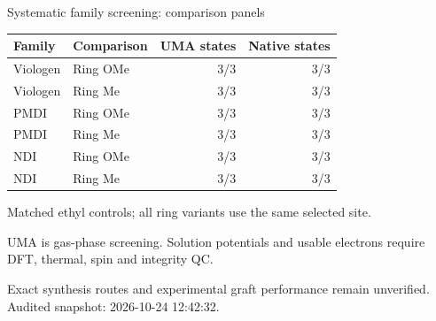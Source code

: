 \begin{frame}{Systematic family screening: comparison panels}
\scriptsize\centering\renewcommand{\arraystretch}{1.1}
\begin{tabular}{@{}llrr@{}}\toprule
Family & Comparison & UMA states & Native states \\ \midrule
Viologen & Ring OMe & 3/3 & 3/3 \\
Viologen & Ring Me & 3/3 & 3/3 \\
PMDI & Ring OMe & 3/3 & 3/3 \\
PMDI & Ring Me & 3/3 & 3/3 \\
NDI & Ring OMe & 3/3 & 3/3 \\
NDI & Ring Me & 3/3 & 3/3 \\
\bottomrule\end{tabular}\par\vspace{1ex}\raggedright
\footnotesize Matched ethyl controls; all ring variants use the same selected site.
\par\vspace{1ex}UMA is gas-phase screening. Solution potentials and usable electrons require DFT, thermal, spin and integrity QC.
\par\vspace{1ex}Exact synthesis routes and experimental graft performance remain unverified.
\vfill\scriptsize Audited snapshot: 2026-10-24 12:42:32.
\end{frame}
